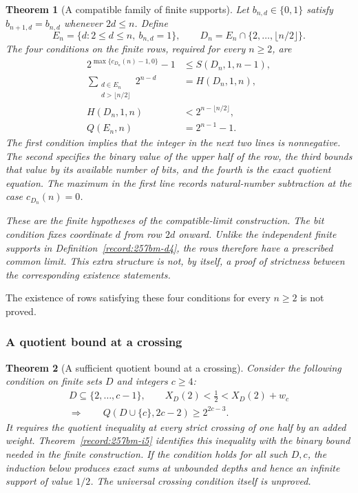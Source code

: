\documentclass[11pt]{article}
\theoremstyle{plain}
\newtheorem{thm}{Theorem}[section]
\theoremstyle{definition}
\theoremstyle{remark}
\begin{document}
\begin{thm}[A compatible family of finite supports]\label{record:257bm-c3}
Let $b_{n,d}\in\{0,1\}$ satisfy $b_{n+1,d}=b_{n,d}$ whenever
$2d\le n$.  Define
\[
 E_n=\{d:2\le d\le n,\ b_{n,d}=1\},\qquad
 D_n=E_n\cap\{2,\ldots,\lfloor n/2\rfloor\}.
\]
The four conditions on the finite rows, required for every $n\ge2$, are
\[
 \begin{aligned}
 2^{\max\{c_{D_n}(n)-1,0\}}-1&\le S(D_n,1,n-1),\\
 \sum_{\substack{d\in E_n\\d>\lfloor n/2\rfloor}}2^{n-d}
     &=H(D_n,1,n),\\
 H(D_n,1,n)&<2^{n-\lfloor n/2\rfloor},\\
 Q(E_n,n)&=2^{n-1}-1.
 \end{aligned}
\]
The first condition implies that the integer in the next two lines is
nonnegative.  The second specifies the binary value of the upper half of
the row, the third bounds that value by its available number of bits, and
the fourth is the exact quotient equation.  The maximum in the first line
records natural-number subtraction at the case $c_{D_n}(n)=0$.

These are the finite hypotheses of the compatible-limit construction.
The bit condition fixes coordinate $d$ from row $2d$ onward.  Unlike the
independent finite supports in Definition~\ref{record:257bm-d4}, the rows
therefore have a prescribed common limit.  This extra structure is not,
by itself, a proof of strictness between the corresponding existence
statements.
\end{thm}
The existence of rows satisfying these four conditions for every $n\ge2$
is not proved.

\subsubsection*{A quotient bound at a crossing}

\begin{thm}[A sufficient quotient bound at a crossing]\label{record:257bm-c4}
Consider the following condition on finite sets $D$ and integers $c\ge4$:
\[
 \begin{gathered}
 D\subseteq\{2,\ldots,c-1\},\qquad
 X_D(2)<\frac12<X_D(2)+w_c\\[2pt]
 \Longrightarrow\qquad Q(D\cup\{c\},2c-2)\ge2^{2c-3}.
 \end{gathered}
\]
It requires the quotient inequality at every strict crossing of one half
by an added weight.  Theorem~\ref{record:257bm-i5} identifies this
inequality with the binary bound needed in the finite construction.
If the condition holds for all such $D,c$, the induction below produces
exact sums at unbounded depths and hence an infinite support of value
$1/2$.  The universal crossing condition itself is unproved.
\end{thm}
\end{document}
